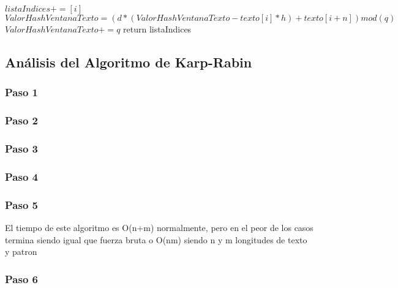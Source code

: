 \begin{algorithm}[H]
    \begin{algorithmic}[1]
        \State $listaIndices += [i]$ 
        \EndIf
    \EndIf 
        \State $ValorHashVentanaTexto = (d * (ValorHashVentanaTexto - texto[i] * h) + texto[i + n]) mod(q)$
         
            \State $ValorHashVentanaTexto += q$
        \EndIf
    \EndIf
\EndFor
\State return listaIndices

\EndProcedure
    \end{algorithmic}
\end{algorithm}


\subsection*{Análisis del Algoritmo de Karp-Rabin}

\subsubsection*{Paso 1}

\subsubsection*{Paso 2}

\subsubsection*{Paso 3}

\subsubsection*{Paso 4}

\subsubsection*{Paso 5}
El tiempo de este algoritmo es O(n+m) normalmente, pero en el peor de los casos termina siendo igual que fuerza bruta o O(nm) siendo n y m longitudes de texto y patron

\subsubsection*{Paso 6}
